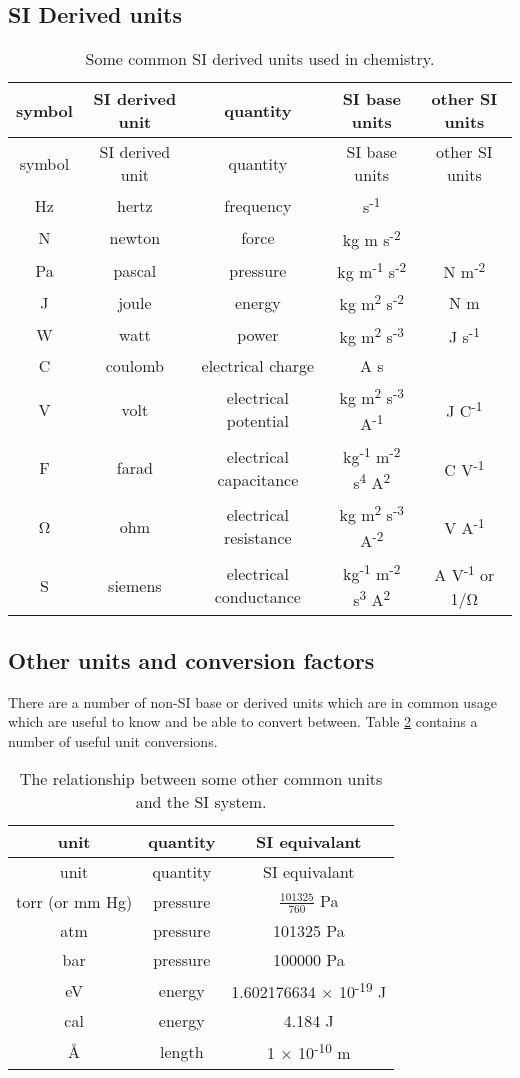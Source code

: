 \documentclass[
]{book}
\begin{document}
\hypertarget{si-derived-units}{%
\subsection{SI Derived units}\label{si-derived-units}}

\begin{longtable}[]{@{}ccccc@{}}
\caption{\label{tab:SIderive} Some common SI derived units used in chemistry.}\tabularnewline
\toprule
symbol & SI derived unit & quantity & SI base units & other SI units\tabularnewline
\midrule
\endfirsthead
\toprule
symbol & SI derived unit & quantity & SI base units & other SI units\tabularnewline
\midrule
\endhead
Hz & hertz & frequency & s\textsuperscript{-1} &\tabularnewline
N & newton & force & kg m s\textsuperscript{-2} &\tabularnewline
Pa & pascal & pressure & kg m\textsuperscript{-1} s\textsuperscript{-2} & N m\textsuperscript{-2}\tabularnewline
J & joule & energy & kg m\textsuperscript{2} s\textsuperscript{-2} & N m\tabularnewline
W & watt & power & kg m\textsuperscript{2} s\textsuperscript{-3} & J s\textsuperscript{-1}\tabularnewline
C & coulomb & electrical charge & A s &\tabularnewline
V & volt & electrical potential & kg m\textsuperscript{2} s\textsuperscript{-3} A\textsuperscript{-1} & J C\textsuperscript{-1}\tabularnewline
F & farad & electrical capacitance & kg\textsuperscript{-1} m\textsuperscript{-2} s\textsuperscript{4} A\textsuperscript{2} & C V\textsuperscript{-1}\tabularnewline
Ω & ohm & electrical resistance & kg m\textsuperscript{2} s\textsuperscript{-3} A\textsuperscript{-2} & V A\textsuperscript{-1}\tabularnewline
S & siemens & electrical conductance & kg\textsuperscript{-1} m\textsuperscript{-2} s\textsuperscript{3} A\textsuperscript{2} & A V\textsuperscript{-1} or 1/Ω\tabularnewline
\bottomrule
\end{longtable}

\hypertarget{other-units-and-conversion-factors}{%
\subsection{Other units and conversion factors}\label{other-units-and-conversion-factors}}

There are a number of non-SI base or derived units which are in common usage which are useful to know and be able to convert between. Table \ref{tab:nonSI} contains a number of useful unit conversions.

\begin{longtable}[]{@{}ccc@{}}
\caption{\label{tab:nonSI} The relationship between some other common units and the SI system.}\tabularnewline
\toprule
unit & quantity & SI equivalant\tabularnewline
\midrule
\endfirsthead
\toprule
unit & quantity & SI equivalant\tabularnewline
\midrule
\endhead
torr (or mm Hg) & pressure & \(\frac{101325}{760}\) Pa\tabularnewline
atm & pressure & 101325 Pa\tabularnewline
bar & pressure & 100000 Pa\tabularnewline
eV & energy & 1.602176634 × 10\textsuperscript{-19} J\tabularnewline
cal & energy & 4.184 J\tabularnewline
Å & length & 1 × 10\textsuperscript{-10} m\tabularnewline
\bottomrule
\end{longtable}
\end{document}
